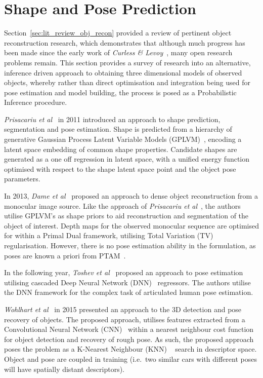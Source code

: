 \section{Shape and Pose Prediction}
\label{sec:lit_review_prediction}
Section~\ref{sec:lit_review_obj_recon} provided a review of pertinent object reconstruction research, 
which demonstrates that although much progress has been made since the early work of \textit{Curless \& 
Levoy}~\cite{Curless1996}, many open research problems remain. This section provides a survey of research 
into an alternative, inference driven approach to obtaining three dimensional models of observed 
objects, whereby rather than direct optimisation and integration being used for pose estimation and 
model building, the process is posed as a Probabilistic Inference procedure.

\textit{Prisacariu et al}~\cite{Prisacariu2011} in 2011 introduced an approach to shape prediction, 
segmentation and pose estimation. Shape is predicted from a hierarchy of generative Gaussian Process 
Latent Variable Models (GPLVM)~\cite{Lawrence2005}, encoding a latent space embedding of common shape 
properties. Candidate shapes are generated as a one off regression in latent space, with a unified 
energy function optimised with respect to the shape latent space point and the object pose parameters.

In 2013, \textit{Dame et al}~\cite{Dame2013} proposed an approach to dense object reconstruction from a 
monocular image source. Like the approach of \textit{Prisacariu et al}~\cite{Prisacariu2011}, the authors 
utilise GPLVM's as shape priors to aid reconstruction and segmentation of the object of interest. Depth maps 
for the observed monocular sequence are optimised for within a Primal Dual framework, utilising 
Total Variation (TV)~\cite{Rudin1992} regularisation. However, there is no pose estimation 
ability in the formulation, as poses are known a priori from PTAM~\cite{Klein2007}.

In the following year, \textit{Toshev et al}~\cite{Toshev2014} proposed an approach to pose estimation 
utilising cascaded Deep Neural Network (DNN)~\cite{LeCun2015} regressors. The authors utilise the DNN 
framework for the complex task of articulated human pose estimation.

\textit{Wohlhart et al}~\cite{Wohlhart2015} in 2015 presented an approach to the 3D detection and pose 
recovery of objects. The proposed approach, utilises features extracted from a Convolutional Neural 
Network (CNN)~\cite{LeCun2015} within a nearest neighbour cost function for object detection and recovery 
of rough pose. As such, the proposed approach poses the problem as a K-Nearest Neighbour (KNN) 
~\cite{Altman1992} search in descriptor space. Object and pose are coupled in training (i.e.\ two similar 
cars with different poses will have spatially distant descriptors).

